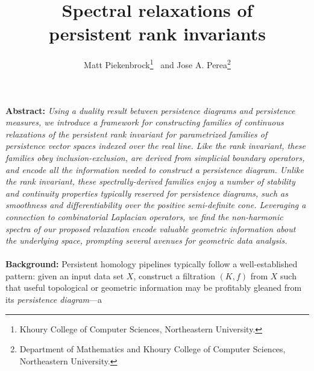\documentclass[10pt twocolumn]{article}
\title{\vspace{-2.0em} 
Spectral relaxations of \\ persistent rank invariants
\vspace{-0.5em}}
\author{Matt Piekenbrock\thanks{Khoury College of Computer Sciences, Northeastern University.} \, and Jose A. Perea\thanks{Department of Mathematics and Khoury College of Computer Sciences, Northeastern University.}}
\date{}
\numberwithin{equation}{section}
\newcommand{\+}{%
	\raisebox{0.18ex}{\scaleobj{0.55}{+}}
}
\theoremstyle{definition}
\theoremstyle{definition}
\begin{document}
\begin{multicols}{2}
\maketitle
\noindent
\textbf{Abstract:} \emph{Using a duality result between persistence diagrams and persistence measures, we introduce a framework for constructing families of continuous relaxations of the persistent rank invariant for parametrized families of persistence vector spaces indexed over the real line. Like the rank invariant, these families obey inclusion-exclusion, are derived from simplicial boundary operators, and encode all the information needed to construct a persistence diagram. 
Unlike the rank invariant, these spectrally-derived families enjoy a number of stability and continuity properties typically reserved for persistence diagrams, such as smoothness and differentiability over the positive semi-definite cone. 
Leveraging a connection to combinatorial Laplacian operators, we find the non-harmonic spectra of our proposed relaxation encode valuable geometric information about the underlying space, prompting several avenues for geometric data analysis.
}
\\
\\
\noindent \textbf{Background:} Persistent homology pipelines typically follow a well-established pattern: given an input data set $X$, construct a filtration $(K, f)$ from $X$ such that useful topological or geometric information may be profitably gleaned from its \emph{persistence diagram}---a 

\end{multicols}
\end{document}
